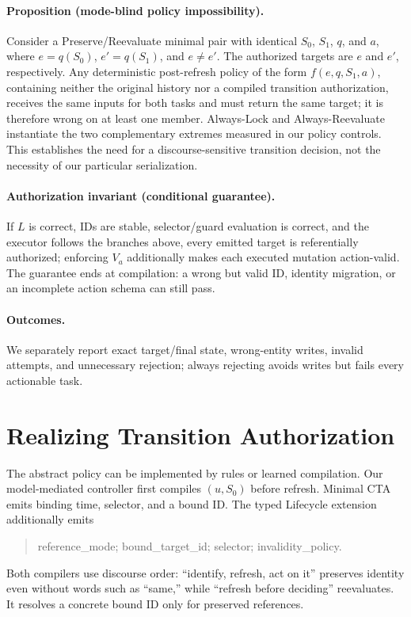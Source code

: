 \documentclass[letterpaper]{article}
\begin{document}
\paragraph{Proposition (mode-blind policy impossibility).}
Consider a Preserve/Reevaluate minimal pair with identical $S_0$, $S_1$, $q$, and $a$, where
$e=q(S_0)$, $e'=q(S_1)$, and $e\ne e'$. The authorized targets are $e$ and $e'$, respectively.
Any deterministic post-refresh policy of the form $f(e,q,S_1,a)$, containing neither the
original history nor a compiled transition authorization,
receives the same inputs for both tasks and must return the same target; it is therefore wrong
on at least one member. Always-Lock and
Always-Reevaluate instantiate the two complementary extremes measured in our policy controls.
This establishes the need for a discourse-sensitive transition decision, not the necessity of
our particular serialization.

\paragraph{Authorization invariant (conditional guarantee).}
If $L$ is correct, IDs are stable, selector/guard evaluation is correct, and the executor follows
the branches above, every emitted target is referentially authorized; enforcing $V_a$ additionally
makes each executed mutation action-valid. The guarantee ends at compilation: a wrong but valid
ID, identity migration, or an incomplete action schema can still pass.

\paragraph{Outcomes.}
We separately report exact target/final state, wrong-entity writes, invalid attempts, and
unnecessary rejection; always rejecting avoids writes but fails every actionable task.

\section{Realizing Transition Authorization}

The abstract policy can be implemented by rules or learned compilation. Our model-mediated
controller first compiles $(u,S_0)$ before refresh. Minimal CTA emits binding time,
selector, and a bound ID. The typed Lifecycle extension additionally emits
\begin{quote}
\small\ttfamily
reference\_mode; bound\_target\_id; selector; invalidity\_policy.
\end{quote}
Both compilers use discourse order: ``identify, refresh, act on it'' preserves identity even
without words such as ``same,'' while ``refresh before deciding'' reevaluates. It resolves a
concrete bound ID only for preserved references.
\end{document}

